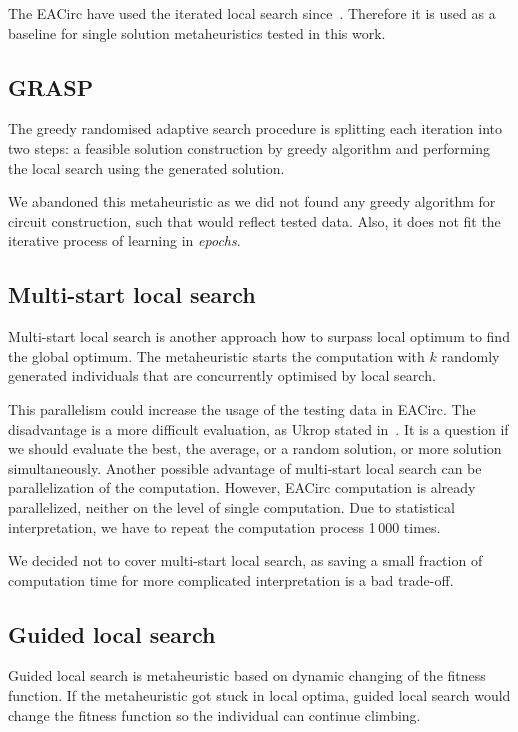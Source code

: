 \documentclass[
  print, %
  Table,   %
  nolof,     %
  nolot,     %
  11pt, %
  oneside  %
]{fithesis3}
\begin{document}
The EACirc have used the iterated local search since~\cite{sys2014constructing}. Therefore it is used as a baseline for single solution metaheuristics tested in this work.

\subsection{GRASP}
\label{subsec:opt-single-sol-grasp}

The greedy randomised adaptive search procedure is splitting each iteration into two steps: a feasible solution construction by greedy algorithm and performing the local search using the generated solution.

We abandoned this metaheuristic as we did not found any greedy algorithm for circuit construction, such that would reflect tested data. Also, it does not fit the iterative process of learning in \textit{epochs}.

\subsection{Multi-start local search}
\label{subsec:opt-single-sol-msls}

Multi-start local search is another approach how to surpass local optimum to find the global optimum. The metaheuristic starts the computation with $k$ randomly generated individuals that are concurrently optimised by local search.

This parallelism could increase the usage of the testing data in EACirc. The disadvantage is a more difficult evaluation, as Ukrop stated in~\cite[Chapter~5]{ukropBcThesis}. It is a question if we should evaluate the best, the average, or a random solution, or more solution simultaneously. Another possible advantage of multi-start local search can be parallelization of the computation. However, EACirc computation is already parallelized, neither on the level of single computation. Due to statistical interpretation, we have to repeat the computation process 1\,000 times.

We decided not to cover multi-start local search, as saving a small fraction of computation time for more complicated interpretation is a bad trade-off.

\subsection{Guided local search}
\label{subsec:opt-single-sol-gls}

Guided local search is metaheuristic based on dynamic changing of the fitness function. If the metaheuristic got stuck in local optima, guided local search would change the fitness function so the individual can continue climbing.
\end{document}
